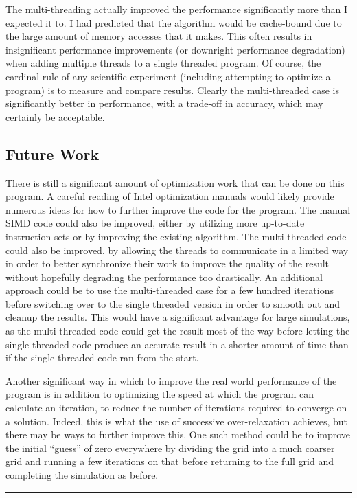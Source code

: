 The multi-threading actually improved the performance significantly more than I expected it to.
I had predicted that the algorithm would be cache-bound due to the large amount of memory accesses
that it makes. This often results in insignificant performance improvements (or downright performance
degradation) when adding multiple threads to a single threaded program. Of course, the cardinal
rule of any scientific experiment (including attempting to optimize a program) is to measure and
compare results. Clearly the multi-threaded case is significantly better in performance, with a trade-off
in accuracy, which may certainly be acceptable.

\subsection{Future Work}

There is still a significant amount of optimization work that can be done on this program. A careful reading
of Intel optimization manuals would likely provide numerous ideas for how to further improve the code
for the program. The manual SIMD code could also be improved, either by utilizing more up-to-date instruction
sets or by improving the existing algorithm. The multi-threaded code could also be improved, by allowing the threads
to communicate in a limited way in order to better synchronize their work to improve the quality of the result without
hopefully degrading the performance too drastically. An additional approach could be to use the multi-threaded case for
a few hundred iterations before switching over to the single threaded version in order to smooth out and cleanup the
results. This would have a significant advantage for large simulations, as the multi-threaded code could get the result
most of the way before letting the single threaded code produce an accurate result in a shorter amount of time than
if the single threaded code ran from the start.

Another significant way in which to improve the real world performance of the program is in addition to optimizing
the speed at which the program can calculate an iteration, to reduce the number of iterations required to
converge on a solution. Indeed, this is what the use of successive over-relaxation achieves, but there may be ways
to further improve this. One such method could be to improve the initial ``guess'' of zero everywhere by dividing
the grid into a much coarser grid and running a few iterations on that before returning to the full grid and completing
the simulation as before.

\begin{center}\rule{2cm}{0.4pt}\end{center}

